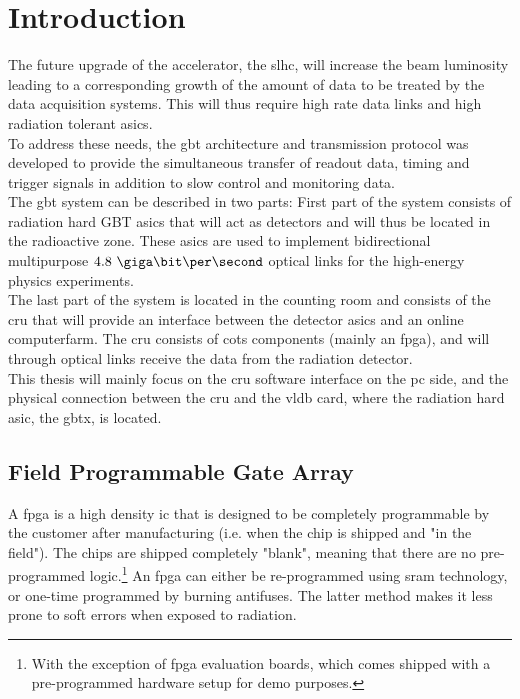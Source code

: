 \documentclass[main.tex]{subfiles}
\begin{document}
\chapter{Introduction}
The future upgrade of the  accelerator, the \gls{slhc}, will increase the beam luminosity leading to a corresponding growth of the amount of data to be treated by the data acquisition systems. This will thus require high rate data links and high radiation tolerant \glspl{asic}.\\

To address these needs, the \gls{gbt} architecture and transmission protocol was developed to provide the simultaneous transfer of readout data, timing and trigger signals in addition to slow control and monitoring data. \\

The \gls{gbt} system can be described in two parts: First part of the system consists of radiation hard GBT \glspl{asic} that will act as detectors and will thus be located in the radioactive zone. These \glspl{asic} are used to implement bidirectional multipurpose $4.8~\giga\bit\per\second$ optical links for the high-energy physics experiments. \\
The last part of the system is located in the counting room and consists of the \gls{cru} that will provide an interface between the detector \glspl{asic} and an online computerfarm. The \gls{cru} consists of \gls{cots} components (mainly an \acrshort{fpga}), and will through optical links receive the data from the radiation detector. \\

This thesis will mainly focus on the \gls{cru} software interface on the \acrshort{pc} side, and the physical connection between the \gls{cru} and the \gls{vldb} card, where the radiation hard \gls{asic}, the \gls{gbt}x, is located.


\section{Field Programmable Gate Array}

A \gls{fpga} is a high density \gls{ic} that is designed to be completely programmable by the customer after manufacturing (i.e. when the chip is shipped and "in the field"). The chips are shipped completely "blank", meaning that there are no pre-programmed logic.\footnote{With the exception of \gls{fpga} evaluation boards, which comes shipped with a pre-programmed hardware setup for demo purposes.} An \gls{fpga} can either be re-programmed using \gls{sram} technology, or one-time programmed by burning antifuses. The latter method makes it less prone to soft errors when exposed to radiation.\\
\end{document}
